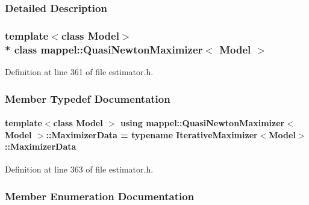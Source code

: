 \subsubsection{Detailed Description}
\subsubsection*{template$<$class Model$>$\\*
class mappel\+::\+Quasi\+Newton\+Maximizer$<$ Model $>$}



Definition at line 361 of file estimator.\+h.



\subsubsection{Member Typedef Documentation}
\paragraph[{\texorpdfstring{Maximizer\+Data}{MaximizerData}}]{\setlength{\rightskip}{0pt plus 5cm}template$<$class Model $>$ using {\bf mappel\+::\+Quasi\+Newton\+Maximizer}$<$ Model $>$\+::{\bf Maximizer\+Data} =  typename {\bf Iterative\+Maximizer}$<$Model$>$\+::{\bf Maximizer\+Data}}\hypertarget{classmappel_1_1QuasiNewtonMaximizer_a558d3c5e494648dcb756de6a2779402e}{}\label{classmappel_1_1QuasiNewtonMaximizer_a558d3c5e494648dcb756de6a2779402e}


Definition at line 363 of file estimator.\+h.



\subsubsection{Member Enumeration Documentation}

